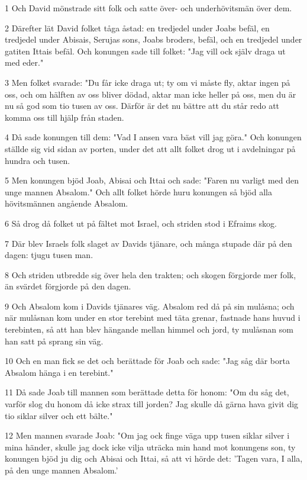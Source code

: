 \par 1 Och David mönstrade sitt folk och satte över- och underhövitsmän över dem.
\par 2 Därefter lät David folket tåga åstad: en tredjedel under Joabs befäl, en tredjedel under Abisais, Serujas sons, Joabs broders, befäl, och en tredjedel under gatiten Ittais befäl. Och konungen sade till folket: "Jag vill ock själv draga ut med eder."
\par 3 Men folket svarade: "Du får icke draga ut; ty om vi måste fly, aktar ingen på oss, och om hälften av oss bliver dödad, aktar man icke heller på oss, men du är nu så god som tio tusen av oss. Därför är det nu bättre att du står redo att komma oss till hjälp från staden.
\par 4 Då sade konungen till dem: "Vad I ansen vara bäst vill jag göra." Och konungen ställde sig vid sidan av porten, under det att allt folket drog ut i avdelningar på hundra och tusen.
\par 5 Men konungen bjöd Joab, Abisai och Ittai och sade: "Faren nu varligt med den unge mannen Absalom." Och allt folket hörde huru konungen så bjöd alla hövitsmännen angående Absalom.
\par 6 Så drog då folket ut på fältet mot Israel, och striden stod i Efraims skog.
\par 7 Där blev Israels folk slaget av Davids tjänare, och många stupade där på den dagen: tjugu tusen man.
\par 8 Och striden utbredde sig över hela den trakten; och skogen förgjorde mer folk, än svärdet förgjorde på den dagen.
\par 9 Och Absalom kom i Davids tjänares väg. Absalom red då på sin mulåsna; och när mulåsnan kom under en stor terebint med täta grenar, fastnade hans huvud i terebinten, så att han blev hängande mellan himmel och jord, ty mulåsnan som han satt på sprang sin väg.
\par 10 Och en man fick se det och berättade för Joab och sade: "Jag såg där borta Absalom hänga i en terebint."
\par 11 Då sade Joab till mannen som berättade detta för honom: "Om du såg det, varför slog du honom då icke strax till jorden? Jag skulle då gärna hava givit dig tio siklar silver och ett bälte."
\par 12 Men mannen svarade Joab: "Om jag ock finge väga upp tusen siklar silver i mina händer, skulle jag dock icke vilja uträcka min hand mot konungens son, ty konungen bjöd ju dig och Abisai och Ittai, så att vi hörde det: 'Tagen vara, I alla, på den unge mannen Absalom.'
